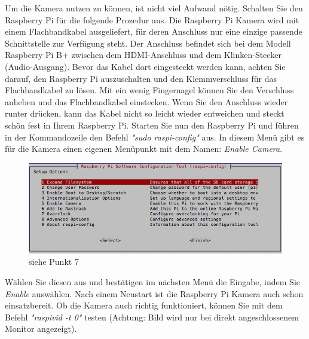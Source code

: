 \documentclass[12pt,a4paper]{scrreprt}
\begin{document}
Um die Kamera nutzen zu können, ist nicht viel Aufwand nötig. Schalten Sie den Raspberry Pi für die folgende Prozedur aus. Die Raspberry Pi Kamera wird mit einem Flachbandkabel ausgeliefert, für deren Anschluss nur eine einzige passende Schnittstelle zur Verfügung steht. Der Anschluss befindet sich bei dem Modell Raspberry Pi B+ zwischen dem HDMI-Anschluss und dem Klinken-Stecker (Audio-Ausgang). Bevor das Kabel dort eingesteckt werden kann, achten Sie darauf, den Raspberry Pi auszuschalten und den Klemmverschluss für das Flachbandkabel zu lösen. Mit ein wenig Fingernagel können Sie den Verschluss anheben und das Flachbandkabel einstecken. Wenn Sie den Anschluss wieder runter drücken, kann das Kabel nicht so leicht wieder entweichen und steckt schön fest in Ihrem Raspberry Pi. Starten Sie nun den Raspberry Pi und führen in der Kommandozeile den Befehl \textit{"sudo raspi-config"} aus. In diesem Menü gibt es für die Kamera einen eigenen Menüpunkt mit dem Namen: \textit{Enable Camera}.\begin{figure}[h] \includegraphics[width=15.8cm]{raspiconfig} \caption{siehe Punkt 7} \end{figure} Wählen Sie diesen aus und bestätigen im nächsten Menü die Eingabe, indem Sie \textit{Enable} auswählen. Nach einem Neustart ist die Raspberry Pi Kamera auch schon einsatzbereit. Ob die Kamera auch richtig funktioniert, können Sie mit dem Befehl \textit{"raspivid -t 0"} testen (Achtung: Bild wird nur bei direkt angeschlossenem Monitor angezeigt). 
\end{document}
